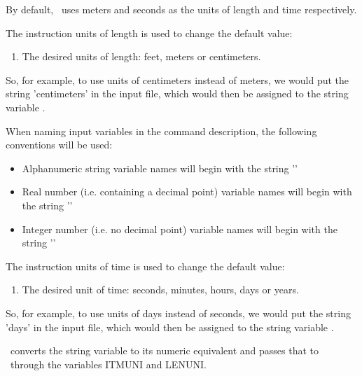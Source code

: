 \label{section:Units}
By default, \mut\ uses meters and seconds as the units of length and time respectively.

The instruction \textsf{units of length} is used to change the default value:

    {
        \squish
        \begin{enumerate}
        \item {}  The desired units of length: feet, meters or centimeters.
        \end{enumerate}

        So, for example, to use units of centimeters instead of meters, we would put the string 'centimeters' in the input file, which would then be assigned to the string variable . }

When naming input variables in the command description, the following conventions will be used:
\begin{itemize}
    \item Alphanumeric string variable names will begin with
    the string '\str{}'
    \item Real number (i.e. containing a decimal point) variable names will begin with
    the string '\rnum{}'
    \item Integer number (i.e. no decimal point) variable names will begin with
    the string '\inum{}'
\end{itemize}

The instruction \textsf{units of time} is used to change the default value:

    {
        \squish
        \begin{enumerate}
        \item {}  The desired unit of time: seconds, minutes, hours, days or years.
        \end{enumerate}

        So, for example, to use units of days instead of seconds, we would put the string 'days' in the input file, which would then be assigned to the string variable .
    }

\mut\ converts the string variable  to its numeric equivalent and passes that to \mfus\ through the variables \textsf{ITMUNI} and \textsf{LENUNI}.

